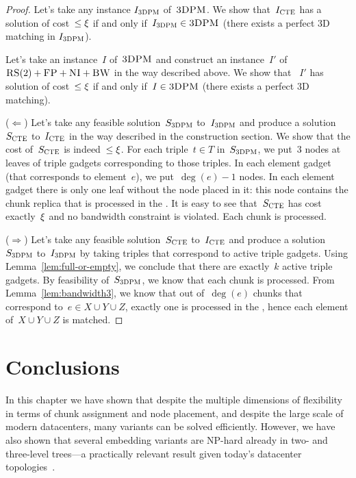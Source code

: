 \begin{proof}
  Let's take any instance $I_{\mathrm{\textsc{3DPM}}}$ of~$\textsc{3DPM}$.
  We show that~$I_{\mathrm{\textsc{CTE}}}$ has a solution of cost~$\leq \xi$ if and only if~$I_{\mathrm{\textsc{3DPM}}} \in \textsc{3DPM}$ (there exists a perfect 3D matching in $I_{\mathrm{\textsc{3DPM}}}$).


  Let's take an instance~$I$ of~$\textsc{3DPM}$ and construct an instance~$I'$
  of~$\textsc{RS}(2)+\textsc{FP}+\textsc{NI}+\textsc{BW}$ in the way described above.  We show that
 ~$I'$ has solution of cost~$\leq \xi$ if and only if~$I \in \textsc{3DPM}$
  (there exists a perfect 3D matching).

  ($\Leftarrow$) Let's take any feasible solution~$S_{\mathrm{\textsc{3DPM}}}$ to~$I_{\mathrm{\textsc{3DPM}}}$ and
  produce a solution~$S_{\mathrm{\textsc{CTE}}}$ to~$I_{\mathrm{\textsc{CTE}}}$ in the way described in the construction section. We show that the cost of~$S_{\mathrm{\textsc{CTE}}}$ is
  indeed~$\leq \xi$.
  For each triple~$t\in T$ in~$S_{\mathrm{\textsc{3DPM}}}$, we put~$3$ nodes at
  leaves of triple gadgets corresponding to those triples.  In each
  element gadget (that corresponds to element~$e$), we put~$\deg(e)-1$
  nodes. In each element gadget there is only one leaf without the
  node placed in it: this node contains the chunk replica that is
  processed in the {\MatchSubtree}.
  It is easy to see that~$S_{\mathrm{\textsc{CTE}}}$ has cost exactly~$\xi$ and no
  bandwidth constraint is violated. Each chunk is processed.

  ($\Rightarrow$) Let's take any feasible solution~$S_{\mathrm{\textsc{CTE}}}$ to~$I_{\mathrm{\textsc{CTE}}}$ and
  produce a solution~$S_{\mathrm{\textsc{3DPM}}}$ to~$I_{\mathrm{\textsc{3DPM}}}$ by taking triples that correspond
  to active triple gadgets. Using Lemma~\ref{lem:full-or-empty}, we
  conclude that there are exactly~$k$ active triple gadgets. By
  feasibility of~$S_{\mathrm{\textsc{3DPM}}}$, we know that each chunk is
  processed. From Lemma~\ref{lem:bandwidth3}, we know that out
  of~$\deg(e)$ chunks that correspond to~$e\in X\cup Y\cup Z$,
  exactly one is processed in the {\MatchSubtree}, hence each
  element of~$X\cup Y\cup Z$ is matched.
\end{proof}


\section{Conclusions}\label{sec:conclusion-static}


In this chapter we have shown that despite the
multiple dimensions of flexibility in terms of chunk assignment and node placement, 
and despite the large scale of modern datacenters, 
many variants can be solved efficiently. However, we have also
shown that several embedding variants are NP-hard already in two-
and three-level trees---a practically relevant result given today's datacenter topologies~\cite{fattree}.


